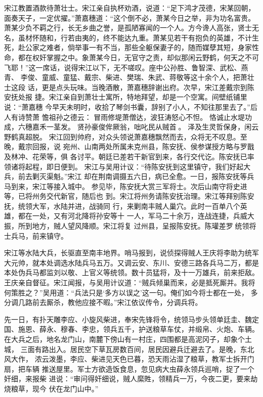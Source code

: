 宋江教置酒款待萧壮士。宋江亲自执杯劝酒，说道：“足下鸿才茂德，宋某回朝，
面奏天子，一定优擢。”萧嘉穗道：“这个倒不必，萧某今日之举，非为功名富贵。
萧某少负不羁之行，长无乡曲之誉，是孤陋寡闻的一个人。方今谗人高张，贤士无
名，虽材怀随和，行若由夷的，终不能达九重。萧某见若干有抱负的英雄，不计生
死，赴公家之难者，倘举事一有不当，那些全躯保妻子的，随而媒孽其短，身家性
命，都在权奸掌握之中。象萧某今日，无官守之责，却似那闲云野鹤，何天之不可
飞耶！”这一席话，说得宋江以下，无不嗟叹。座中公孙胜、鲁智深、武松、燕青、
李俊、童威、童猛、戴宗、柴进、樊瑞、朱武、蒋敬等这十余个人，把萧壮士这段
话，更是点头玩味。当晚酒散，萧嘉穗辞谢出府。次早，宋江差戴宗到陈安抚处报
捷。宋江亲自到萧壮士寓所，特地拜望，却是一个空寓。间壁纸铺里说：“萧嘉穗
今早天未明时，收拾了琴剑书囊，辞别了小人，不知往那里去了。”后人有诗赞萧
憺祖孙之德云：
冒雨修堤萧僧达，波狂涛怒心不怛。
恪诚止水堤功成，六穗嘉禾一茎发。
贤孙豪俊侔厥翁，咄叱民从贼首𢫬。
泽及生灵哲保身，闲云野鹤真超脱。
宋江回到帅府，对众头领说萧嘉穗飘然而去，众将无不叹息。至晚，戴宗回报，说
宛州、山南两处所属未克州县，陈安抚、侯参谋授方略与罗戬及林冲、花荣等，俱
各讨平。朝廷已差若干新官到来，各行交代讫。陈安抚已率领诸将起程，即日便到。
宋江与吴用计议：“待陈安抚到这里镇守，我们好起大兵，前去剿灭渠魁。”宋江
却在荆南调摄五六日，病已全愈。一日，报陈安抚等兵马到来，宋江等接入城中。
参见毕，陈安抚大赏三军将士。次后山南守将史进等，已将州务交代新官，随后也
到。宋江将州务请陈安抚治理。宋江等拜别陈安抚，统领大军，水陆并进，战骑同
行，来剿南丰贼人巢穴。此时一百单八个英雄，都在一处，又有河北降将孙安等十
一人，军马二十余万，连战连捷，兵威大振，所到地方，贼人望风降顺。宋江将复
过州县，呈报陈安抚。陈瓘差罗统领将士兵马，前来镇守。

宋江等水陆大兵，长驱直至南丰地界。哨马报到，说侦探得贼人王庆将李助为统军
大元帅，就本处调选水陆兵马五万。又调云安、东川、安德三路各兵马二万，都是
本处伪兵马都监刘以敬、上官义等统领。数十员猛将，及十一万雄兵，前来拒敌。
王庆亲自督征。宋江闻报，与吴用计议道：“贼兵倾巢而来，必是抵死厮并。我将
何策胜之？”吴用道：“兵法只是‘多方以误之’这一句。俺们如今将士都在一处，
多分调几路前去厮杀，教他应接不暇。”宋江依议传令，分调兵将。

先一日，有扑天雕李应、小旋风柴进，奉宋先锋将令，统领马步头领单廷圭、魏定
国、施恩、薛永、穆春、李忠，领兵五千，护送粮草车仗，并缎帛、火炮、车辆。
在大兵之后，地名龙门山，南麓下傍山有一村庄，四围都是高泥冈子，却象个土城，
三面有路出入。居民空下草瓦房数百间，居民因避兵迁避去了。是晚，东北风大作，
浓云泼墨，李应、柴进见天色已暮，恐天雨沾湿了粮草，教军士拆开门扇，把车辆
推送屋里。军士方欲造饭食息，忽见病大虫薛永领兵巡哨，捉了一个奸细，来报柴
进说：“审问得奸细说，贼人縻貹，领精兵一万，今夜二更，要来劫烧粮草，现今
伏在龙门山中。”

